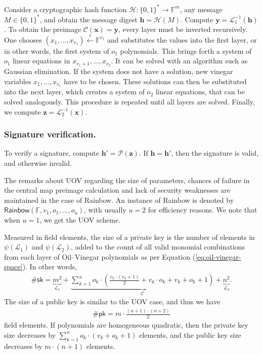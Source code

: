 \documentclass[english]{ufsc-thesis-rn46-2019/ufsc-thesis-rn46-2019}
\newcommand{\random}{\overset{\mathsf{r}}{\gets}}
\theoremstyle{definition}
\begin{document}
Consider a cryptographic hash function
$\mathcal{H} : {\{0, 1\}}^{*} \to \mathbb{F}^{m}$, any message
$M \in {\{0, 1\}}^{*}$, and obtain the message digest
$\mathbf{h} = \mathcal{H}(M)$. Compute
$\mathbf{y} = \mathcal{L}_{1}^{-1}(\mathbf{h})$. To obtain the preimage
$\mathcal{C}(\mathbf{x}) = \mathbf{y}$, every layer must be inverted
recursively. One chooses $(x_{1}, \dots, x_{v_{1}}) \random \mathbb{F}^{v_{1}}$
and substitutes the values into the first layer, or in other words, the first
system of $o_{1}$ polynomials. This brings forth a system of $o_{1}$ linear
equations in $x_{v_{1} + 1}, \dots, x_{v_{2}}$. It can be solved with an
algorithm such as Gaussian elimination. If the system does not have a solution,
new vinegar variables $x_{1}, \dots, x_{v_{1}}$ have to be chosen. These
solutions can then be substituted into the next layer, which creates a system
of $o_{2}$ linear equations, that can be solved analogously. This procedure is
repeated until all layers are solved. Finally, we compute
$\mathbf{z} = \mathcal{L}_{2}^{-1}(\mathbf{x})$.

\subsubsection{Signature verification.}

To verify a signature, compute $\mathbf{h'} = \mathcal{P}(\mathbf{z})$. If
$\mathbf{h} = \mathbf{h'}$, then the signature is valid, and otherwise invalid.

The remarks about UOV regarding the size of parameters, chances of failure in
the central map preimage calculation and lack of security weaknesses are
maintained in the case of Rainbow. An instance of Rainbow is denoted by
$\mathsf{Rainbow}(\mathbb{F}, v_{1}, o_{1}, \dots, o_{u})$, with usually
$u = 2$ for efficiency reasons. We note that when $u = 1$, we get the UOV
scheme.

Measured in field elements, the size of a private key is the number of elements
in $\psi(\mathcal{L}_{1})$ and $\psi(\mathcal{L}_{2})$, added to the count of
all valid monomial combinations from each layer of Oil--Vinegar polynomials as
per Equation (\ref{eq:oil-vinegar-space}). In other words,
\begin{align}\label{eq:sk-size-rainbow}
  \#\mathsf{sk} = \underbrace{m^{2}}_{\mathcal{L}_{1}}
    + \underbrace{\sum_{k = 1}^{u} o_{k} \cdot \left(
      \frac{v_{k} \cdot (v_{k} + 1)}{2} + v_{k} \cdot o_{k} + v_{k} + o_{k} + 1
    \right)}_{\mathcal{C}} + \underbrace{n^{2}}_{\mathcal{L}_{2}}.
\end{align}
The size of a public key is similar to the UOV case, and thus we have
\begin{align}
  \#\mathsf{pk} = m \cdot \frac{(n + 1) \cdot (n + 2)}{2}
\end{align}
field elements. If polynomials are homogeneous quadratic, then the private key
size decreases by $\sum_{k = 1}^{u} o_{k} \cdot (v_{k} + o_{k} + 1)$ elements,
and the public key size decreases by $m \cdot (n + 1)$ elements.
\end{document}

